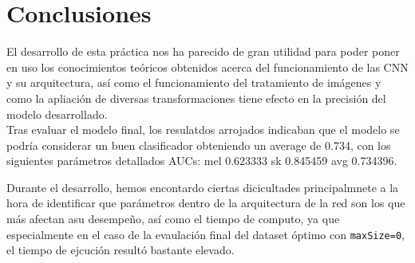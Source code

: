 \section{Conclusiones}
El desarrollo de esta práctica nos ha parecido de gran utilidad para poder poner en uso los conocimientos teóricos obtenidos acerca del funcionamiento de las CNN y su arquitectura, 
así como el funcionamiento del tratamiento de imágenes y como la apliación de diversas transformaciones tiene efecto en la precisión del modelo desarrollado.\\
Tras evaluar el modelo final, los resulatdos arrojados indicaban que el modelo se podría considerar un buen clasificador obteniendo un average de 0.734, con los siguientes parámetros detallados AUCs: mel 0.623333 sk 0.845459 avg 0.734396.\smallskip

Durante el desarrollo, hemos encontardo ciertas dicicultades principalmnete a la hora de identificar que parámetros dentro de la arquitectura de la red son los que más afectan asu desempeño, así como el tiempo de computo, ya que especialmente en el caso de la evaulación final del dataset óptimo con \texttt{maxSize=0}, el tiempo de ejcución resultó bastante elevado.